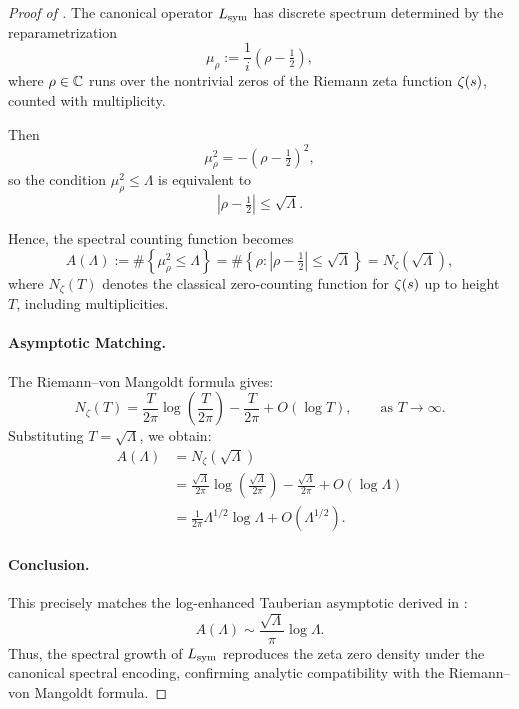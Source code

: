 \begin{proof}[Proof of ]
The canonical operator \( L_{\mathrm{sym}} \) has discrete spectrum determined by the reparametrization
\[
\mu_\rho := \frac{1}{i} \left( \rho - \tfrac{1}{2} \right),
\]
where \( \rho \in \mathbb{C} \) runs over the nontrivial zeros of the Riemann zeta function \( \zeta(s) \), counted with multiplicity.

Then
\[
\mu_\rho^2 = -(\rho - \tfrac{1}{2})^2,
\]
so the condition \( \mu_\rho^2 \le \Lambda \) is equivalent to
\[
|\rho - \tfrac{1}{2}| \le \sqrt{\Lambda}.
\]

Hence, the spectral counting function becomes
\[
A(\Lambda) := \#\left\{ \mu_\rho^2 \le \Lambda \right\}
= \#\left\{ \rho : |\rho - \tfrac{1}{2}| \le \sqrt{\Lambda} \right\}
= N_\zeta(\sqrt{\Lambda}),
\]
where \( N_\zeta(T) \) denotes the classical zero-counting function for \( \zeta(s) \) up to height \( T \), including multiplicities.

\paragraph{Asymptotic Matching.}
The Riemann–von Mangoldt formula gives:
\[
N_\zeta(T) = \frac{T}{2\pi} \log\left( \frac{T}{2\pi} \right) - \frac{T}{2\pi} + O(\log T),
\qquad \text{as } T \to \infty.
\]
Substituting \( T = \sqrt{\Lambda} \), we obtain:
\[
\begin{aligned}
A(\Lambda) &= N_\zeta(\sqrt{\Lambda}) \\
&= \frac{\sqrt{\Lambda}}{2\pi} \log\left( \frac{\sqrt{\Lambda}}{2\pi} \right) - \frac{\sqrt{\Lambda}}{2\pi} + O(\log \Lambda) \\
&= \frac{1}{2\pi} \Lambda^{1/2} \log \Lambda + O(\Lambda^{1/2}).
\end{aligned}
\]

\paragraph{Conclusion.}
This precisely matches the log-enhanced Tauberian asymptotic derived in :
\[
A(\Lambda) \sim \frac{\sqrt{\Lambda}}{\pi} \log \Lambda.
\]
Thus, the spectral growth of \( L_{\mathrm{sym}} \) reproduces the zeta zero density under the canonical spectral encoding, confirming analytic compatibility with the Riemann–von Mangoldt formula.
\end{proof}
